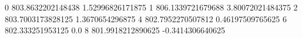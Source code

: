 0 803.8632202148438 1.52996826171875
1 806.1339721679688 3.80072021484375
2 803.7003173828125 1.3670654296875
4 802.7952270507812 0.46197509765625
6 802.333251953125 0.0
8 801.9918212890625 -0.3414306640625
